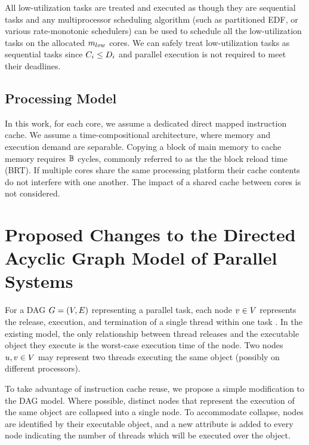 All low-utilization tasks are treated and executed as though they are
sequential tasks and any multiprocessor scheduling algorithm (such as
partitioned EDF, or various rate-monotonic schedulers) can be used to
schedule all the low-utilization tasks on the allocated $m_{low}$
cores. We can safely treat low-utilization tasks as sequential tasks
since $\workload{i} \le \Deadline{i}$ and parallel execution is not required to meet their
deadlines. 

\subsection{Processing Model}

In this work, for each core, we assume a dedicated direct mapped
instruction cache. We assume a time-compositional architecture\addcite,
where memory and execution demand are separable. Copying a block of 
main memory to cache memory requires $\mathbb{B}$ cycles, commonly
referred to as the the block reload time (BRT). If multiple cores share
the same processing platform their cache contents do not interfere with
one another. The impact of a shared cache between cores is not considered.


\section{Proposed Changes to the Directed Acyclic Graph Model of Parallel Systems}


For a DAG ${\Dag{} = (\nodeset{}, \edgeset{})}$ representing a parallel task, each node ${\node{1} \in \nodeset{}}$ represents
the release, execution, and termination of a single thread within one task 
\addcite. In the existing model, the only relationship between thread releases and the executable object they execute is the worst-case execution time of the node. Two nodes ${\node{0}, \node{1} \in \nodeset{}}$ may represent two threads executing the same object (possibly on different processors).

To take advantage of instruction cache reuse, we propose a simple modification to the DAG
model. Where possible, distinct nodes that represent the execution of
the same object are collapsed into a single node. To accommodate collapse,
nodes are identified by their executable object, and a new attribute is added to every node
indicating the number of threads which will be executed over the object.

